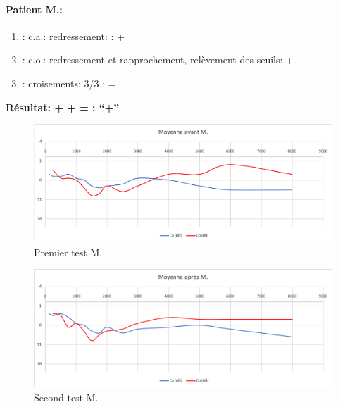          \paragraph{ Patient M.:}
	\begin{enumerate}

 		\item : c.a.: redressement: : +   %

 		\item : c.o.: redressement et rapprochement,
                  relèvement des seuils:  +     %
 		\item : croisements: 3/3 :  =

                \end{enumerate}

                \textbf{ Résultat:  +  +  =     : ``+''}

                \begin{figure}[th]
\centering
\includegraphics[width=1\linewidth]{images/graphiques/m_pre.png}
\caption[Patient M. : 1° test]{Premier test M.}

\end{figure}


                        \begin{figure}[th]
\centering
\includegraphics[width=1\linewidth]{images/graphiques/m_post.png}
\caption[Patient M. : 2° test]{Second test M.}

\end{figure}

